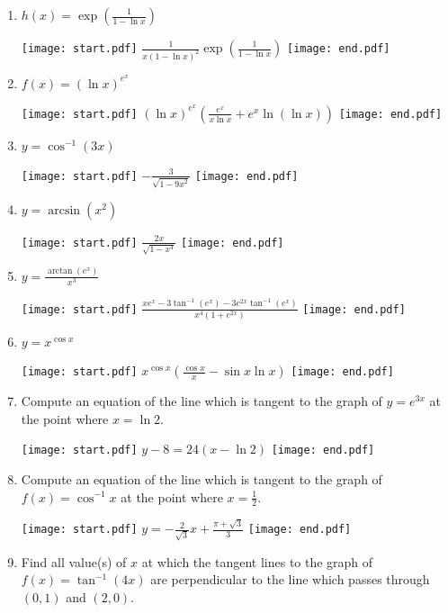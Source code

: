 \documentclass[12pt]{article}
\begin{document}
\begin{enumerate}
\item $h(x) = \exp{\left(\frac{1}{1-\ln x}\right)}$ 

\texttt{[image: start.pdf]}
{{$\frac{1}{x(1-\ln{x})^2}\exp{\left(\frac{1}{1-\ln x}\right)}$}}
\texttt{[image: end.pdf]}


\item $f(x) = (\ln{x})^{e^{x}}$ 

\texttt{[image: start.pdf]}
{{$(\ln{x})^{e^{x}}\left(\frac{e^{x}}{x\ln{x}}+e^{x}\ln{(\ln{x})}\right)$}}
\texttt{[image: end.pdf]}


\item $y = \cos^{-1}{(3x)}$ 

\texttt{[image: start.pdf]}
{{$-\frac{3}{\sqrt{1-{9x}^2}}$}}
\texttt{[image: end.pdf]}


\item $y = \arcsin{(x^2)}$ 

\texttt{[image: start.pdf]}
{{$\frac{2x}{\sqrt{1-x^4}}$}}
\texttt{[image: end.pdf]}


\item $y = \frac{\arctan{(e^x)}}{x^3}$ 

\texttt{[image: start.pdf]}
{{$\frac{xe^{x}-3\tan^{-1}{(e^x)}-3e^{2x}\tan^{-1}{(e^x)}}{x^4(1+e^{2x})}$}}
\texttt{[image: end.pdf]}


\item $y=x^{\cos{x}}$

\texttt{[image: start.pdf]}
{{$x^{\cos{x}}\left(\frac{\cos{x}}{x}-\sin{x}\ln{x}\right)$}}
\texttt{[image: end.pdf]}


\item Compute an equation of the line which is tangent to the graph of $y=e^{3x}$ at the point where $x=\ln2$.

\texttt{[image: start.pdf]}
{{$y-8=24(x-\ln{2})$}}
\texttt{[image: end.pdf]}


\item Compute an equation of the line which is tangent to the graph of $f(x)=\cos^{-1}{x}$ at the point where $x=\frac{1}{2}$.

\texttt{[image: start.pdf]}
{{$y=-\frac{2}{\sqrt{3}}x+\frac{\pi+\sqrt{3}}{3}$}}
\texttt{[image: end.pdf]}


\item Find all value(s) of $x$ at which the tangent lines to the graph of $f(x)=\tan^{-1}{(4x)}$ are perpendicular to the line which passes through $(0,1)$ and $(2,0)$.


\end{enumerate}
\end{document}
